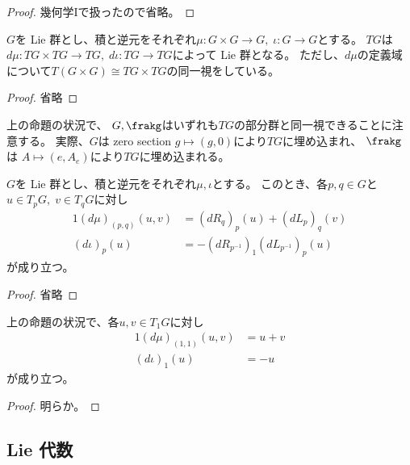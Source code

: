\documentclass[report]{jlreq}
\begin{document}
\begin{proof}
    幾何学Iで扱ったので省略。
\end{proof}


\begin{proposition}[$TG$は Lie 群]
    $G$を Lie 群とし、積と逆元をそれぞれ$\mu \colon G \times G \to G,\; \iota \colon G \to G$とする。
    $TG$は$d\mu \colon TG \times TG \to TG,\; d\iota \colon TG \to TG$によって Lie 群となる。
    ただし、$d\mu$の定義域について$T(G \times G) \cong TG \times TG$の同一視をしている。
\end{proposition}

\begin{proof}
    省略
\end{proof}

\begin{remark}
    上の命題の状況で、
    $G, \frakg$はいずれも$TG$の部分群と同一視できることに注意する。
    実際、$G$は zero section $g \mapsto (g, 0)$により$TG$に埋め込まれ、
    $\frakg$は $A \mapsto (e, A_e)$により$TG$に埋め込まれる。
\end{remark}

\begin{proposition}[$TG$上の演算]
    $G$を Lie 群とし、積と逆元をそれぞれ$\mu, \iota$とする。
    このとき、各$p, q \in G$と$u \in T_pG,\; v \in T_qG$に対し
    \begin{alignat}{1}
        (d\mu)_{(p, q)}(u, v)
            &= (dR_q)_p(u) + (dL_p)_q(v) \\
        (d\iota)_p(u)
            &= - (dR_{p^{-1}})_{1} (dL_{p^{-1}})_p(u)
    \end{alignat}
    が成り立つ。
\end{proposition}

\begin{proof}
    省略
\end{proof}

\begin{corollary}[$T_1G$上の演算]
    上の命題の状況で、各$u, v \in T_1G$に対し
    \begin{alignat}{1}
        (d\mu)_{(1, 1)}(u, v) &= u + v \\
        (d\iota)_1(u) &= - u
    \end{alignat}
    が成り立つ。
\end{corollary}

\begin{proof}
    明らか。
\end{proof}


\subsection{Lie 代数}
\end{document}

